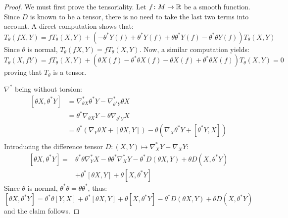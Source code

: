 \begin{proof}
    We must first prove the tensoriality. Let $f \colon M \to \mathbb{R}$ be a smooth function. Since $D$ is known to be 
    a tensor, there is no need to take the last two terms into account. A direct computation shows that:
    \begin{equation}
        T_\theta(fX,Y) = f T_\theta(X,Y) +
         \left( - \theta^* Y(f) + \theta^* Y(f) + \theta \theta^* Y(f) - \theta^* \theta Y(f) \right) T_\theta(X,Y)
    \end{equation}
    Since $\theta$ is normal, $ T_\theta(fX,Y) = f T_\theta(X,Y) $.
    Now, a similar computation yields:
    \begin{equation}
        T_\theta(X,fY) = f T_\theta(X,Y) + 
        \left( \theta X(f) - \theta^*\theta X(f) - \theta  X(f) + \theta^* \theta X(f) \right)T_\theta(X,Y) = 0
    \end{equation}
    proving that $T_\theta$ is a tensor.

    $\nabla^*$ being without torsion:
    \begin{equation}
        \begin{split}
            \left[ \theta X, \theta^* Y \right] & = \nabla^*_{\theta X} \theta^* Y - \nabla^*_{\theta^*Y} \theta X \\
            & = \theta^* \nabla_{\theta X} Y - \theta \nabla_{\theta^*Y} X \\
            & = \theta^* \left( \nabla_Y \theta X + \left[ \theta X, Y \right] \right) 
            - \theta \left( \nabla_X \theta^* Y  + \left[ \theta^*Y, X \right]\right) \\
        \end{split}
    \end{equation}
    Introducing the difference tensor $D \colon (X,Y) \mapsto \nabla_X^* Y - \nabla_X Y$:
    \begin{equation}
       \begin{split}
         \left[ \theta X, \theta^* Y \right]  =&
           \theta^* \theta \nabla^*_Y X - \theta \theta^* \nabla^*_X Y  - \theta^* D\left( \theta X, Y \right) + \theta D\left( X, \theta^*Y \right)\\
           & + \theta^* \left[ \theta X, Y \right] + \theta \left[ X, \theta^* Y \right]
       \end{split} 
    \end{equation}
    Since $\theta$ is normal, $\theta^* \theta = \theta \theta^*$, thus:
    \begin{equation}
        \left[ \theta X, \theta^* Y \right] = \theta^* \theta \left[ Y,X \right] + \theta^* \left[ \theta X, Y \right] + \theta \left[ X, \theta^* Y \right]
        -\theta^* D\left( \theta X, Y \right) + \theta D\left( X, \theta^*Y \right)
    \end{equation}
    and the claim follows.
\end{proof}

